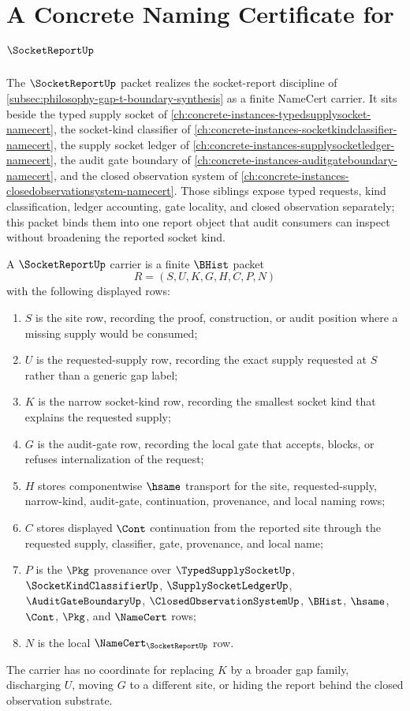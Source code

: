 \chapter{A Concrete Naming Certificate for $\SocketReportUp$}
\label{ch:concrete-instances-socket-report-namecert}

The $\SocketReportUp$ packet realizes the socket-report discipline of \autoref{subsec:philosophy-gap-t-boundary-synthesis} as a finite NameCert carrier. It sits beside the typed supply socket of \autoref{ch:concrete-instances-typedsupplysocket-namecert}, the socket-kind classifier of \autoref{ch:concrete-instances-socketkindclassifier-namecert}, the supply socket ledger of \autoref{ch:concrete-instances-supplysocketledger-namecert}, the audit gate boundary of \autoref{ch:concrete-instances-auditgateboundary-namecert}, and the closed observation system of \autoref{ch:concrete-instances-closedobservationsystem-namecert}. Those siblings expose typed requests, kind classification, ledger accounting, gate locality, and closed observation separately; this packet binds them into one report object that audit consumers can inspect without broadening the reported socket kind.

\begin{definition}
\label{def:socket-report-carrier}
A $\SocketReportUp$ carrier is a finite $\BHist$ packet
$$
R=(S,U,K,G,H,C,P,N)
$$
with the following displayed rows:
\begin{enumerate}
\item $S$ is the site row, recording the proof, construction, or audit position where a missing supply would be consumed;
\item $U$ is the requested-supply row, recording the exact supply requested at $S$ rather than a generic gap label;
\item $K$ is the narrow socket-kind row, recording the smallest socket kind that explains the requested supply;
\item $G$ is the audit-gate row, recording the local gate that accepts, blocks, or refuses internalization of the request;
\item $H$ stores componentwise $\hsame$ transport for the site, requested-supply, narrow-kind, audit-gate, continuation, provenance, and local naming rows;
\item $C$ stores displayed $\Cont$ continuation from the reported site through the requested supply, classifier, gate, provenance, and local name;
\item $P$ is the $\Pkg$ provenance over $\TypedSupplySocketUp$, $\SocketKindClassifierUp$, $\SupplySocketLedgerUp$, $\AuditGateBoundaryUp$, $\ClosedObservationSystemUp$, $\BHist$, $\hsame$, $\Cont$, $\Pkg$, and $\NameCert$ rows;
\item $N$ is the local $\NameCert_{\SocketReportUp}$ row.
\end{enumerate}
The carrier has no coordinate for replacing $K$ by a broader gap family, discharging $U$, moving $G$ to a different site, or hiding the report behind the closed observation substrate.
\end{definition}

